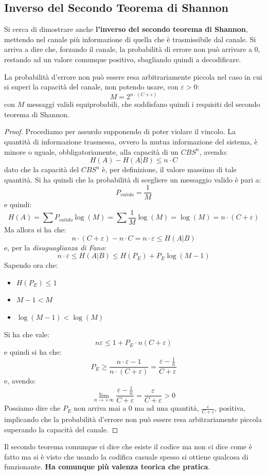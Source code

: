 \documentclass[a4paper,12pt, oneside]{book}
\begin{document}
\subsection{Inverso del Secondo Teorema di Shannon}
Si cerca di dimostrare anche \textbf{l'inverso del secondo teorema di Shannon},
mettendo nel canale più informazione di quella che è trasmissibile dal
canale. Si arriva a dire che, forzando il canale, la probabilità di errore non
può arrivare a 0, restando ad un valore comunque positivo, sbagliando quindi a
decodificare.
\begin{teorema}
  La probabilità d'errore non può essere resa
  arbitrariamente piccola nel caso in cui si superi la capacità del canale, non
  potendo usare, con $\varepsilon>0$:
  \[M=2^{n\cdot(C+\varepsilon)}\]
  con $M$ messaggi validi equiprobabili, che soddisfano quindi i requisiti del
  secondo teorema di Shannon. 
\end{teorema}
\begin{proof}
  Procediamo per assurdo supponendo di poter violare il vincolo. La quantità di
  informazione trasmessa, ovvero la mutua informazione del sistema, è minore o
  uguale, obbligatoriamente, alla capacità di un $CBS^n$, avendo:
  \[H(A)-H(A|B)\leq n\cdot C\]
  dato che la capacità del $CBS^n$ è, per definizione, il valore massimo di tale
  quantità. Si ha quindi che la probabilità di scegliere un messaggio valido è
  pari a:
  \[P_{valido}=\frac{1}{M}\]
  e quindi:
  \[H(A)=\sum P_{valido}\log (M)=\sum\frac{1}{M}\log(M)=\log(M)=n\cdot
    (C+\varepsilon)\]
  Ma allora si ha che:
  \[n\cdot(C+\varepsilon)-n\cdot C=n\cdot \varepsilon\leq H(A|B)\]
  e, per la \emph{disuguaglianza di Fano}:
  \[n\cdot \varepsilon\leq H(A|B)\leq H(P_E)+P_E\log(M-1)\]
  Sapendo ora che:
  \begin{itemize}
    \item $H(P_E)\leq 1$
    \item $M-1<M$
    \item $\log(M-1)<\log(M)$
  \end{itemize}
  Si ha che vale:
  \[n\varepsilon\leq 1+P_E\cdot n(C+\varepsilon)\]
  e quindi si ha che:
  \[P_E\geq\frac{n\cdot\varepsilon-1}{n\cdot
      (C+\varepsilon)}=\frac{\varepsilon-\frac{1}{n}}{C+\varepsilon}\]
  e, avendo:
  \[\lim_{n\to
      +\infty}\frac{\varepsilon-\frac{1}{n}}{C+\varepsilon}=
    \frac{\varepsilon}{C+\varepsilon}>0\]
  Possiamo dire che $P_E$ non arriva mai a 0 ma ad una quantità,
  $\frac{\varepsilon}{C+\varepsilon}$, positiva, implicando che la probabilità
  d'errore non può essere resa arbitrariamente piccola superando la capacità del
  canale. 
\end{proof}
Il secondo teorema comunque ci dice che esiste il codice ma non ci dice come è
fatto ma si è 
visto che usando la codifica casuale spesso si ottiene qualcosa di
funzionante. \textbf{Ha comunque più valenza teorica che pratica}.
\end{document}
